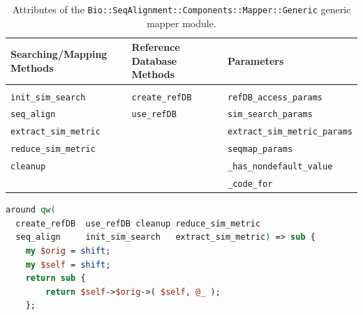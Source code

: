 \documentclass[10pt]{article}
\begin{document}
\begin{table}[!h]\centering
\caption[Table caption text]{Attributes of the \texttt{Bio::SeqAlignment::Components::Mapper::Generic} generic mapper module. }
	\begin{tabularx}{1.0\textwidth}{Y|Y|Y}
\toprule
Searching/Mapping Methods       & Reference Database Methods  & Parameters\\
\midrule\\
\texttt{init\_sim\_search}      & \texttt{create\_refDB}      & \texttt{refDB\_access\_params}\\
\texttt{seq\_align}             & \texttt{use\_refDB}         & \texttt{sim\_search\_params}\\
\texttt{extract\_sim\_metric}   &                             & \texttt{extract\_sim\_metric\_params}\\
\texttt{reduce\_sim\_metric}    &                             & \texttt{seqmap\_params}\\
\texttt{cleanup}                &                             & \texttt{\_has\_nondefault\_value}\\                       
\texttt{ }                      &                             & \texttt{\_code\_for}\\
\bottomrule
 \end{tabularx}
\label{tab:GenericMapperModule}
\end{table}

\noindent\hspace{0.00\linewidth}\begin{minipage}{1.0\textwidth}
\begin{lstlisting}[language=Perl,basicstyle=\footnotesize,frame=none,caption={Around modification of the methods of the generic mapper module.},label={lst:AroundModifier},captionpos=b]
around qw(
  create_refDB  use_refDB cleanup reduce_sim_metric 
  seq_align     init_sim_search   extract_sim_metric) => sub {
    my $orig = shift;
    my $self = shift;
    return sub {
        return $self->$orig->( $self, @_ );
    };
\end{lstlisting}
\end{minipage}
\end{document}
